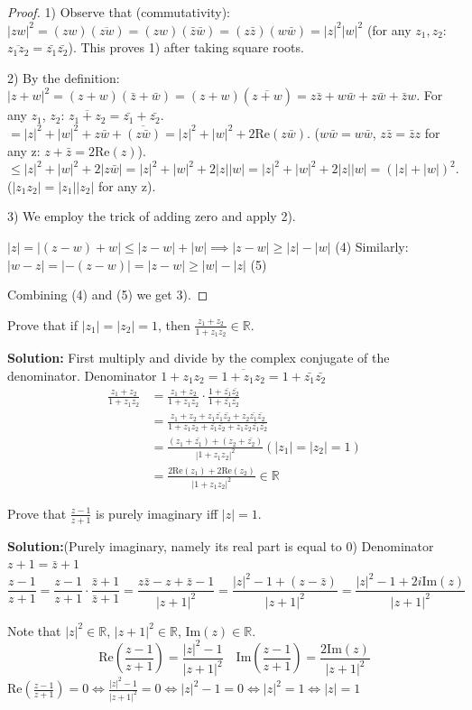 \documentclass[12pt]{article}
\newcommand{\R}{\mathbb{R}}
\newcommand{\Rea}{\text{Re}}
\newcommand{\Ima}{\text{Im}}
\begin{document}
\begin{proof}
1) Observe that (commutativity):
$ |zw|^2 = (zw)(\overline{zw}) = (zw)(\bar{z}\bar{w}) = (z\bar{z})(w\bar{w}) = |z|^2|w|^2 $ (for any $z_1,z_2$: $\overline{z_1z_2}=\bar{z_1}\bar{z_2}$).
This proves 1) after taking square roots.

2) By the definition:
$|z+w|^2 = (z+w)(\bar{z}+\bar{w}) = (z+w)(\overline{z+w}) = z\bar{z} + w\bar{w} + z\bar{w} + \bar{z}w$.
For any $z_1$, $z_2$: $\overline{z_1+z_2} = \bar{z_1}+\bar{z_2}$.
$= |z|^2 + |w|^2 + z\bar{w} + \overline{(z\bar{w})} = |z|^2+|w|^2 + 2\Rea(z\bar{w})$.
($w\bar{w} = w\bar{w}$, $z\bar{z} = \bar{z}z$ for any z: $z+\bar{z} = 2\Rea(z)$).
$\leq |z|^2+|w|^2+2|z\bar{w}| = |z|^2+|w|^2+2|z||w| = |z|^2+|w|^2+2|z||w| = (|z|+|w|)^2$.
($|z_1z_2| = |z_1||z_2|$ for any z).

3) We employ the trick of adding zero and apply 2).

$|z| = |(z-w)+w| \leq |z-w|+|w| \implies |z-w|\geq |z|-|w|$  (4)
Similarly: $|w-z| = |-(z-w)| = |z-w| \geq |w|-|z|$   (5)

Combining (4) and (5) we get 3).
\end{proof}
\begin{example}
Prove that if $|z_1|=|z_2|=1$, then $\frac{z_1+z_2}{1+z_1z_2} \in \R$.

\textbf{Solution:}
First multiply and divide by the complex conjugate of the denominator.
Denominator $1+z_1z_2 = \overline{1+z_1z_2} = 1+\bar{z_1}\bar{z_2}$
\begin{align*}
  \frac{z_1+z_2}{1+z_1z_2} &= \frac{z_1+z_2}{1+z_1z_2} \cdot \frac{1+\bar{z_1}\bar{z_2}}{1+\bar{z_1}\bar{z_2}} \\
  &= \frac{z_1+z_2+z_1\bar{z_1}\bar{z_2}+z_2\bar{z_1}\bar{z_2}}{1+z_1z_2+\bar{z_1}\bar{z_2}+z_1z_2\bar{z_1}\bar{z_2}} \\
  &= \frac{(z_1+\bar{z_1}) + (z_2+\bar{z_2})}{|1+z_1z_2|^2} (|z_1|=|z_2|=1)\\
  &= \frac{2\Rea(z_1)+2\Rea(z_2)}{|1+z_1z_2|^2} \in \R
\end{align*}
\end{example}

\begin{example}
Prove that $\frac{z-1}{z+1}$ is purely imaginary iff $|z|=1$.

\textbf{Solution:}(Purely imaginary, namely its real part is equal to 0)
Denominator $z+1 = \bar{z}+1$
\[ \frac{z-1}{z+1} = \frac{z-1}{z+1} \cdot \frac{\bar{z}+1}{\bar{z}+1} = \frac{z\bar{z}-z+\bar{z}-1}{|z+1|^2} = \frac{|z|^2-1 + (z-\bar{z})}{|z+1|^2} = \frac{|z|^2-1 + 2i\Ima(z)}{|z+1|^2} \]

Note that $|z|^2 \in \R$, $|z+1|^2 \in \R$, $\Ima(z) \in \R$.
\[ \Rea(\frac{z-1}{z+1}) = \frac{|z|^2-1}{|z+1|^2} \quad \Ima(\frac{z-1}{z+1}) = \frac{2\Ima(z)}{|z+1|^2} \]
$\Rea(\frac{z-1}{z+1}) = 0 \iff \frac{|z|^2-1}{|z+1|^2} = 0 \iff |z|^2-1 = 0 \iff |z|^2=1 \iff |z|=1$
\end{example}
\end{document}
